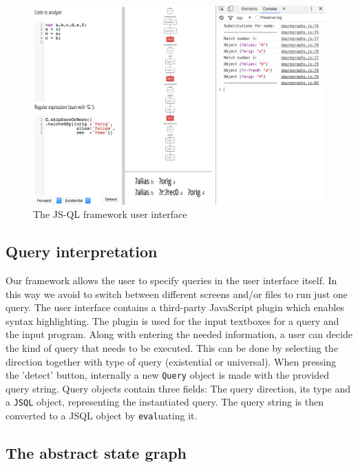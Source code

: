 \begin{figure}[h]
    \centering
      \includegraphics[width=1\textwidth]{images/UI} 
      \caption{The JS-QL framework user interface}
    \label{fig:UI}
\end{figure}

\subsection*{Query interpretation}

Our framework allows the user to specify queries in the user interface itself. In this way we avoid to switch between different screens and/or files to run just one query. The user interface contains a third-party JavaScript plugin which enables syntax highlighting. The plugin is used for the input textboxes for a query and the input program. Along with entering the needed information, a user can decide the kind of query that needs to be executed. This can be done by selecting the direction together with type of query (existential or universal). When pressing the 'detect' button, internally a new \texttt{Query} object is made with the provided query string. Query objects contain three fields: The query direction, its type and a \texttt{JSQL} object, representing the instantiated query. The query string is then converted to a JSQL object by \texttt{eval}uating it.

\subsection*{The abstract state graph}

